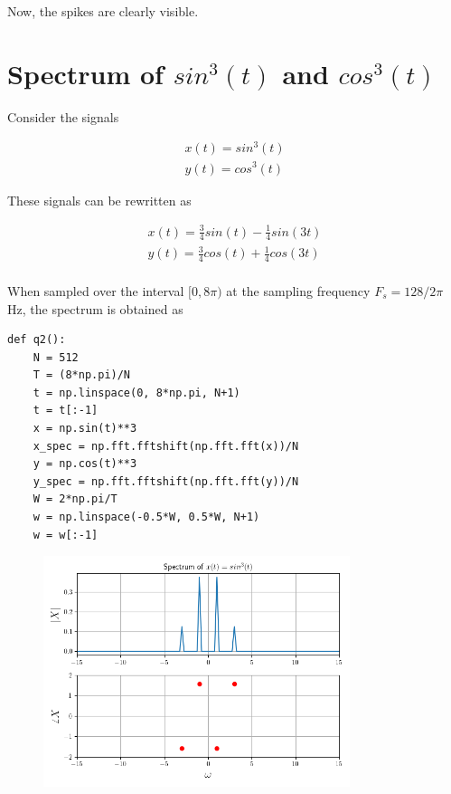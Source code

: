 \documentclass[12pt, a4paper]{article}
\begin{document}
Now, the spikes are clearly visible.

\section{Spectrum of $sin^3(t)$ and $cos^3(t)$}

Consider the signals

\begin{align*}
x(t) = sin^3(t) \\
y(t) = cos^3(t)
\end{align*}

These signals can be rewritten as

\begin{align*}
x(t) = \frac{3}{4}sin(t) - \frac{1}{4}sin(3t) \\
y(t) = \frac{3}{4}cos(t) + \frac{1}{4}cos(3t) \\
\end{align*}

When sampled over the interval $[0, 8\pi)$ at the sampling frequency $F_s = 128/2\pi$ Hz, the spectrum is obtained as

\begin{lstlisting}
def q2():
    N = 512
    T = (8*np.pi)/N
    t = np.linspace(0, 8*np.pi, N+1)
    t = t[:-1]
    x = np.sin(t)**3
    x_spec = np.fft.fftshift(np.fft.fft(x))/N
    y = np.cos(t)**3
    y_spec = np.fft.fftshift(np.fft.fft(y))/N
    W = 2*np.pi/T
    w = np.linspace(-0.5*W, 0.5*W, N+1)
    w = w[:-1]
\end{lstlisting}

\begin{figure}[H]
\centering
\includegraphics[width=0.8\textwidth]{q2sin.png}
\end{figure}
\end{document}
